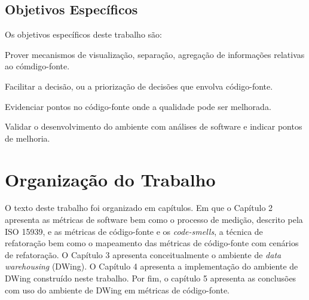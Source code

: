 
\subsection{Objetivos Específicos}

Os objetivos específicos deste trabalho são:


\begin{objectives}

	\item Prover mecanismos de visualização, separação, agregação de informações relativas ao cómdigo-fonte.

	\item Facilitar a decisão, ou a priorização de decisões que envolva código-fonte.

	\item Evidenciar pontos no código-fonte onde a qualidade pode ser melhorada.

	\item Validar o desenvolvimento do ambiente com análises de software e indicar pontos de melhoria.

    \end{objectives}
	


\section{Organização do Trabalho}

O texto deste trabalho foi organizado em capítulos. Em que o Capítulo 2 apresenta as 
métricas de software bem como o processo de medição, descrito pela ISO 15939, 
e as métricas de código-fonte e os \textit{code-smells}, a técnica de refatoração bem como o mapeamento das métricas de código-fonte com cenários de refatoração. O Capítulo 3 apresenta conceitualmente o ambiente de \textit{data warehousing} (DWing). O Capítulo 4 apresenta a implementação do ambiente de DWing construído neste 
trabalho. Por fim, o capítulo 5 apresenta as conclusões com uso do 
ambiente de DWing em métricas de código-fonte. 